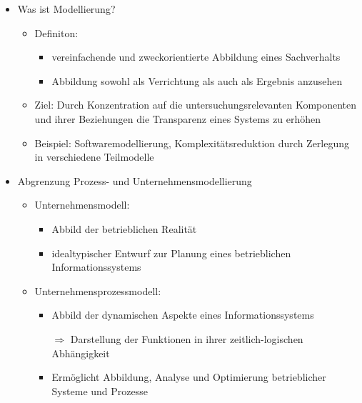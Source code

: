 \begin{itemize}
\item Was ist Modellierung?
\item[] 
	\begin{itemize}
	\item Definiton:
		\begin{itemize}
		\item vereinfachende und zweckorientierte Abbildung eines Sachverhalts
		\item Abbildung sowohl als Verrichtung als auch als Ergebnis anzusehen
		\end{itemize}
	
	\item Ziel: Durch Konzentration auf die untersuchungsrelevanten Komponenten und ihrer Beziehungen die Transparenz eines Systems zu erhöhen
	\item Beispiel: Softwaremodellierung, Komplexitätsreduktion durch Zerlegung in verschiedene Teilmodelle
	\end{itemize}

\item Abgrenzung Prozess- und Unternehmensmodellierung
\item[] 
	\begin{itemize}
	\item Unternehmensmodell:
		\begin{itemize}
		\item Abbild der betrieblichen Realität
		\item idealtypischer Entwurf zur Planung eines betrieblichen Informationssystems
		\end{itemize}		 
		
	\item Unternehmensprozessmodell:
		\begin{itemize}
		\item Abbild der dynamischen Aspekte eines Informationssystems
		\item[$\Rightarrow$] Darstellung der Funktionen in ihrer zeitlich-logischen Abhängigkeit
		\item Ermöglicht Abbildung, Analyse und Optimierung betrieblicher Systeme und Prozesse
		\end{itemize}		 
	
	\end{itemize}

\end{itemize}

